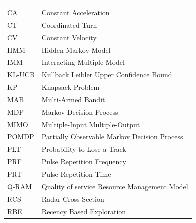 \documentclass[english, 12pt, a4paper, elec, utf8, a-1b, online]{aaltothesis}
\numberwithin{equation}{section}
\begin{document}
\begin{tabular}{ll}
&\\
CA & Constant Acceleration \\
CT & Coordinated Turn \\
CV & Constant Velocity \\
HMM & Hidden Markov Model \\
IMM & Interacting Multiple Model \\
KL-UCB & Kullback Leibler Upper Confidence Bound \\
KP & Knapsack Problem \\
MAB  & Multi-Armed Bandit \\
MDP & Markov Decision Process \\
MIMO & Multiple-Input Multiple-Output \\
POMDP & Partially Observable Markov Decision Process \\
PLT & Probability to Lose a Track \\
PRF  &  Pulse Repetition Frequency \\
PRT  & Pulse Repetition Time \\
Q-RAM & Quality of service Resource Management Model \\
RCS & Radar Cross Section \\
RBE  & Recency Based Exploration \\

\end{tabular}
\end{document}
